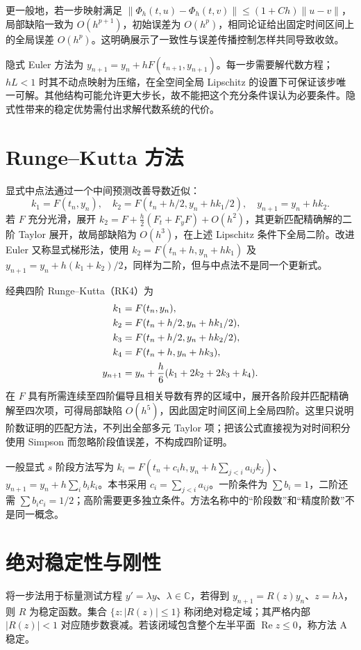 更一般地，若一步映射满足 $\|\Phi_h(t,u)-\Phi_h(t,v)\|\le(1+Ch)\|u-v\|$，局部缺陷一致为 $O(h^{p+1})$，初始误差为 $O(h^p)$，相同论证给出固定时间区间上的全局误差 $O(h^p)$。这明确展示了一致性与误差传播控制怎样共同导致收敛。

隐式 Euler 方法为 $y_{n+1}=y_n+hF(t_{n+1},y_{n+1})$。每一步需要解代数方程；$hL<1$ 时其不动点映射为压缩，在全空间全局 Lipschitz 的设置下可保证该步唯一可解。其他结构可能允许更大步长，故不能把这个充分条件误认为必要条件。隐式性带来的稳定优势需付出求解代数系统的代价。

\section{Runge--Kutta 方法}
显式中点法通过一个中间预测改善导数近似：
\[
 k_1=F(t_n,y_n),\quad k_2=F(t_n+h/2,y_n+hk_1/2),\quad y_{n+1}=y_n+hk_2.
\]
若 $F$ 充分光滑，展开 $k_2=F+\tfrac h2(F_t+F_yF)+O(h^2)$，其更新匹配精确解的二阶 Taylor 展开，故局部缺陷为 $O(h^3)$，在上述 Lipschitz 条件下全局二阶。改进 Euler 又称显式梯形法，使用 $k_2=F(t_n+h,y_n+hk_1)$ 及 $y_{n+1}=y_n+h(k_1+k_2)/2$，同样为二阶，但与中点法不是同一个更新式。

经典四阶 Runge--Kutta（RK4）为
\begin{align}
 k_1&=F(t_n,y_n),\notag\\
 k_2&=F(t_n+h/2,y_n+hk_1/2),\notag\\
 k_3&=F(t_n+h/2,y_n+hk_2/2),\notag\\
 k_4&=F(t_n+h,y_n+hk_3),\notag\\
 y_{n+1}&=y_n+\frac h6(k_1+2k_2+2k_3+k_4).
 \label{eq:na-rk4}
\end{align}
在 $F$ 具有所需连续至四阶偏导且相关导数有界的区域中，展开各阶段并匹配精确解至四次项，可得局部缺陷 $O(h^5)$，因此固定时间区间上全局四阶。这里只说明阶数证明的匹配方法，不列出全部多元 Taylor 项；把该公式直接视为对时间积分使用 Simpson 而忽略阶段值误差，不构成四阶证明。

一般显式 $s$ 阶段方法写为 $k_i=F(t_n+c_ih,y_n+h\sum_{j<i}a_{ij}k_j)$、$y_{n+1}=y_n+h\sum_i b_ik_i$。本书采用 $c_i=\sum_{j<i}a_{ij}$。一阶条件为 $\sum b_i=1$，二阶还需 $\sum b_ic_i=1/2$；高阶需要更多独立条件。方法名称中的“阶段数”和“精度阶数”不是同一概念。

\section{绝对稳定性与刚性}
\label{sec:na-ode-stability}
\begin{definition}[稳定函数与绝对稳定域]
将一步法用于标量测试方程 $y'=\lambda y$、$\lambda\in\mathbb C$，若得到 $y_{n+1}=R(z)y_n$、$z=h\lambda$，则 $R$ 为稳定函数。集合 $\{z:|R(z)|\le1\}$ 称闭绝对稳定域；其严格内部 $|R(z)|<1$ 对应随步数衰减。若该闭域包含整个左半平面 $\operatorname{Re}z\le0$，称方法 A 稳定。
\end{definition}

